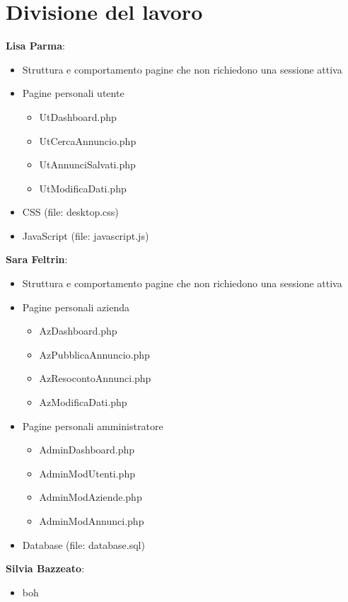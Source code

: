 \section{Divisione del lavoro}

	 \textbf{Lisa Parma}:
	\begin{itemize}
		\item Struttura e comportamento pagine che non richiedono una sessione attiva
		\item Pagine personali utente
		\begin{itemize}
			\item UtDashboard.php
			\item UtCercaAnnuncio.php
			\item UtAnnunciSalvati.php
			\item UtModificaDati.php
		\end{itemize}
		\item CSS (file: desktop.css)
		\item JavaScript (file: javascript.js)
	\end{itemize}
	 \textbf{Sara Feltrin}:
	\begin{itemize}
		\item Struttura e comportamento pagine che non richiedono una sessione attiva
		\item Pagine personali azienda
		\begin{itemize}
			\item AzDashboard.php
			\item AzPubblicaAnnuncio.php
			\item AzResocontoAnnunci.php
			\item AzModificaDati.php
		\end{itemize}
		\item Pagine personali amministratore
		\begin{itemize}
			\item AdminDashboard.php
			\item AdminModUtenti.php
			\item AdminModAziende.php
			\item AdminModAnnunci.php
		\end{itemize}
	\item Database (file: database.sql)
	\end{itemize}
	 \textbf{Silvia Bazzeato}:
	\begin{itemize}
		\item boh
	\end{itemize}



		


